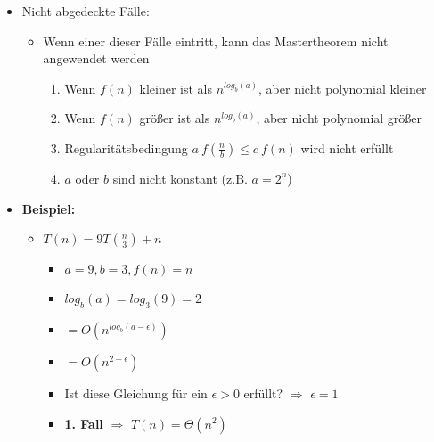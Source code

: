 \begin{itemize}
\begin{itemize}
                \item Nicht abgedeckte Fälle:
                    \begin{itemize}
                        \item Wenn einer dieser Fälle eintritt, kann das Mastertheorem nicht angewendet werden
                            \begin{enumerate}
                                \item Wenn $f(n)$ kleiner ist als $n^{log_b(a)}$, aber nicht polynomial kleiner
                                \item Wenn $f(n)$ größer ist als $n^{log_b(a)}$, aber nicht polynomial größer
                                \item Regularitätsbedingung $a~f(\frac{n}{b}) \leq c~f(n)$ wird nicht erfüllt
                                \item $a$ oder $b$ sind nicht konstant (z.B. $a=2^n$)
                            \end{enumerate}
                    \end{itemize}

                \item \textbf{Beispiel:}
                    \begin{itemize}
                        \item $T(n) = 9T(\frac{n}{3}) + n$
                            \begin{itemize}
                                \item $a=9, b=3, f(n)=n$
                                \item $log_b(a) = log_3(9) = 2$
                                \item {} $= O(n^{log_b(a-\epsilon)})$
                                \item[] {\makebox[1.5cm][l]{}} $= O(n^{2-\epsilon})$
                                \item Ist diese Gleichung für ein $\epsilon > 0$ erfüllt? $\Rightarrow$ $\epsilon = 1$
                                \item \textbf{1. Fall} $\Rightarrow$ $T(n) = \Theta(n^2)$ 
                            \end{itemize}


\end{itemize}
\end{itemize}
\end{itemize}

